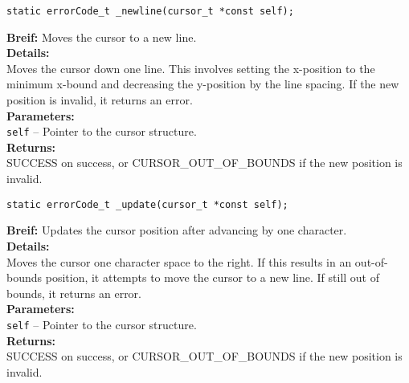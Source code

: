 \begin{verbatim}
static errorCode_t _newline(cursor_t *const self);
\end{verbatim}
\textbf{Breif:} Moves the cursor to a new line. \\
\textbf{Details:} \\
\hspace*{1cm}Moves the cursor down one line. This involves setting the x-position to the minimum x-bound and decreasing the y-position by the line spacing. If the new position is invalid, it returns an error. \\
\textbf{Parameters:} \\
\hspace*{1cm}\texttt{self} -- Pointer to the cursor structure. \\
\textbf{Returns:} \\
\hspace*{1cm}SUCCESS on success, or CURSOR\_OUT\_OF\_BOUNDS if the new position is invalid. \\[1em]

\begin{verbatim}
static errorCode_t _update(cursor_t *const self);
\end{verbatim}
\textbf{Breif:} Updates the cursor position after advancing by one character. \\
\textbf{Details:} \\
\hspace*{1cm}Moves the cursor one character space to the right. If this results in an out-of-bounds position, it attempts to move the cursor to a new line. If still out of bounds, it returns an error. \\
\textbf{Parameters:} \\
\hspace*{1cm}\texttt{self} -- Pointer to the cursor structure. \\
\textbf{Returns:} \\
\hspace*{1cm}SUCCESS on success, or CURSOR\_OUT\_OF\_BOUNDS if the new position is invalid. \\[1em]

